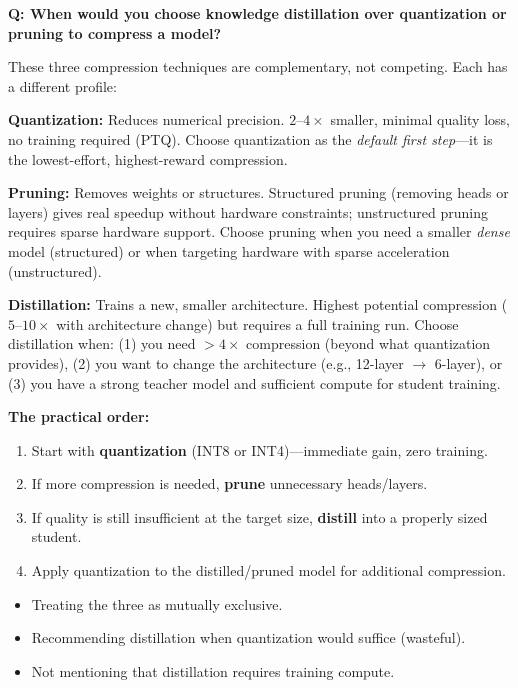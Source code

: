 \begin{interviewq}
\textbf{Q: When would you choose knowledge distillation over quantization or pruning to
compress a model?}

 \quad {} \quad \badgefreq{\freqmed}

\stronganswer
These three compression techniques are complementary, not competing.  Each has a
different profile:

\textbf{Quantization:}  Reduces numerical precision.  $2$--$4\times$ smaller, minimal
quality loss, no training required (PTQ).  Choose quantization as the \emph{default first
step}---it is the lowest-effort, highest-reward compression.

\textbf{Pruning:}  Removes weights or structures.  Structured pruning (removing heads or
layers) gives real speedup without hardware constraints; unstructured pruning requires
sparse hardware support.  Choose pruning when you need a smaller \emph{dense} model
(structured) or when targeting hardware with sparse acceleration (unstructured).

\textbf{Distillation:}  Trains a new, smaller architecture.  Highest potential
compression ($5$--$10\times$ with architecture change) but requires a full training run.
Choose distillation when: (1) you need $>$$4\times$ compression (beyond what quantization
provides), (2) you want to change the architecture (e.g., 12-layer $\to$ 6-layer), or
(3) you have a strong teacher model and sufficient compute for student training.

\textbf{The practical order:}
\begin{enumerate}
    \item Start with \textbf{quantization} (INT8 or INT4)---immediate gain, zero training.
    \item If more compression is needed, \textbf{prune} unnecessary heads/layers.
    \item If quality is still insufficient at the target size, \textbf{distill} into a
          properly sized student.
    \item Apply quantization to the distilled/pruned model for additional compression.
\end{enumerate}

\redflags
\begin{itemize}
    \item Treating the three as mutually exclusive.
    \item Recommending distillation when quantization would suffice (wasteful).
    \item Not mentioning that distillation requires training compute.
\end{itemize}


\end{interviewq}
